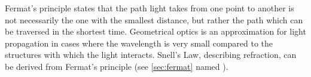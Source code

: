     \label{sec:fermat}
    Fermat’s principle states that the path light takes from one point 
    to another is not necessarily the one with the smallest distance,
    but rather the path which can be traversed in the shortest time.
    Geometrical optics is an approximation for light propagation in 
    cases where the wavelength is very small compared to the
    structures with which the light interacts. Snell’s Law, describing 
    refraction, can be derived from Fermat’s principle 
    (see \ref{sec:fermat} named ).